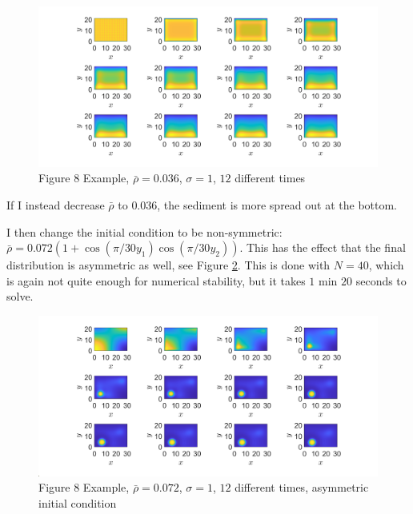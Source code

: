 \documentclass[11pt, a4paper]{article}
\theoremstyle{definition}
\begin{document}
	
	\begin{figure}[h]
		\centering
		\includegraphics[scale=0.35]{Ex8F1b.png}
		\caption{Figure 8 Example, $\bar \rho = 0.036$, $\sigma = 1$, $12$ different times} 
		\label{F1b}
	\end{figure}
	If I instead decrease $\bar \rho$  to $0.036$, the sediment is more spread out at the bottom.
	
	I then change the initial condition to be non-symmetric: $\bar \rho = 0.072 (1 + \cos(\pi / 30 y_1)\cos(\pi / 30 y_2))$. This has the effect that the final distribution is asymmetric as well, see Figure \ref{Fx}. This is done with $N = 40$, which is again not quite enough for numerical stability, but it takes $1$ min $20$ seconds to solve.
	\begin{figure}[h]
		\centering
		\includegraphics[scale=0.4]{Ex8NonSym.png}
		\caption{Figure 8 Example, $\bar \rho = 0.072$, $\sigma = 1$, $12$ different times, asymmetric initial condition} 
		\label{Fx}
	\end{figure}
\end{document}
